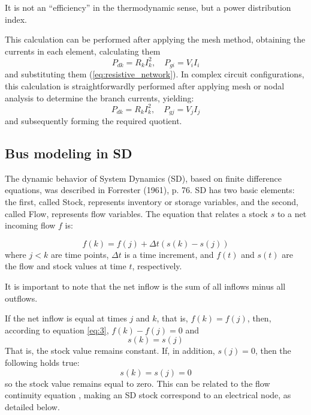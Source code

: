 \documentclass[11pt, a4paper]{article}
\begin{document}
It is not an ``efficiency'' in the thermodynamic sense, but a power distribution index.

This calculation can be performed after applying the mesh method, obtaining the currents in each element, calculating them
\[
P_{dk} = R_k I_k^2, \quad P_{gi} = V_i I_i
\]
and substituting them (\ref{eq:resistive_network}). In complex circuit configurations, this calculation is straightforwardly performed after applying mesh or nodal analysis to determine the branch currents, yielding:
\[
P_{dk} = R_k I_k^2, \quad P_{gj} = V_j I_j
\]
and subsequently forming the required quotient.




\subsection{Bus modeling in SD}

The dynamic behavior of System Dynamics (SD), based on finite difference equations, was described in Forrester (1961), p. 76. SD has two basic elements: the first, called Stock, represents inventory or storage variables, and the second, called Flow, represents flow variables. The equation that relates a stock $s$ to a net incoming flow $f$ is:

\begin{equation}
	f(k) = f(j) + \Delta t(s(k) - s(j))
	\label{eq:3}
\end{equation}
where $j < k$ are time points, $\Delta t$ is a time increment, and $f(t)$ and $s(t)$ are the flow and stock values at time $t$, respectively.

It is important to note that the net inflow is the sum of all inflows minus all outflows.

If the net inflow is equal at times $j$ and $k$, that is, $f(k) = f(j)$, then, according to equation \ref{eq:3}, $f(k) - f(j) = 0$ and
\begin{equation}
	s(k) = s(j)
	\label{eq:4}
\end{equation}
That is, the stock value remains constant. If, in addition, $s(j) = 0$, then the following holds true:
\begin{equation}
	s(k) = s(j) = 0
	\label{eq:5}
\end{equation}
so the stock value remains equal to zero. This can be related to the flow continuity equation \cite{Euler1757}, making an SD stock correspond to an electrical node, as detailed below.
\end{document}
